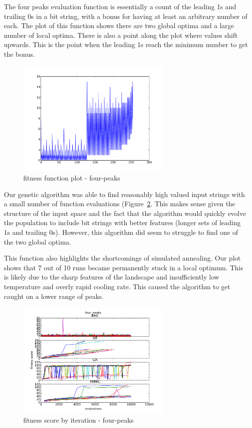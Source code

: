 \documentclass{sig-alternate}
\begin{document}
The four peaks evaluation function is essentially a count of the leading 1s and trailing 0s in a bit string, with a bonus for having at least an arbitrary number of each. The plot of this function shows there are two global optima and a large number of local optima. There is also a point along the plot where values shift upwards. This is the point when the leading 1s reach the minimum number to get the bonus.

\begin{figure}[!htbp]
    \centering
    \includegraphics[width=3in]{part1.2/four-peaks-plot.pdf}
    \caption{fitness function plot - four-peaks\label{plot-four-peaks}}
\end{figure} 

Our genetic algorithm was able to find reasonably high valued input strings with a small number of function evaluations (Figure~\ref{over-time-four-peaks}. This makes sense given the structure of the input space and the fact that the algorithm would quickly evolve the population to include bit strings with better features (longer sets of leading 1s and trailing 0s). However, this algorithm did seem to struggle to find one of the two global optima.

This function also highlights the shortcomings of simulated annealing. Our plot shows that 7 out of 10 runs became permanently stuck in a local optimum. This is likely due to the sharp features of the landscape and insufficiently low temperature and overly rapid cooling rate. This caused the algorithm to get caught on a lower range of peaks.


\begin{figure}[!htbp]
    \centering
    \includegraphics[width=3in]{part1.2/four-peaks-over-time.pdf}
    \caption{fitness score by iteration - four-peaks\label{over-time-four-peaks}}
\end{figure} 
\end{document}
